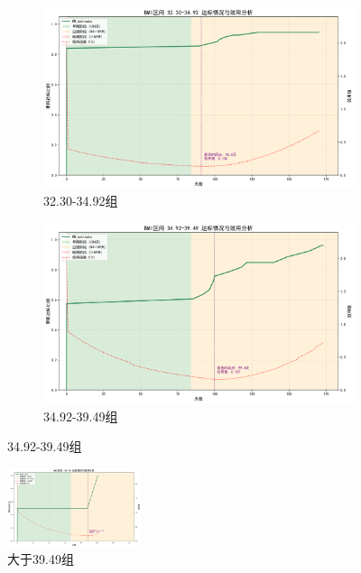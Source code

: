 \documentclass{article}
\begin{document}
\begin{figure}[H]
    \centering
    \begin{subfigure}[b]{0.35\textwidth}  %
        \centering
        \includegraphics[width=\textwidth]{graph/BMI_32.30_34.92_utility_analysis.png}  %
        \caption{32.30-34.92组}  %
        \label{fig:sub1}  %
    \end{subfigure}
    \hspace{0.05\textwidth}  %
    \begin{subfigure}[b]{0.35\textwidth}
        \centering
        \includegraphics[width=\textwidth]{graph/BMI_34.92_39.49_utility_analysis.png}
        \caption{34.92-39.49组}
        \label{fig:sub2}
    \end{subfigure}
    \label{fig:two}  %
\end{figure}
\begin{figure}[H]  %
    \centering  %
    \includegraphics[width=0.35\textwidth]{graph/BMI_gt39.49_utility_analysis.png}  %
    \caption{大于39.49组}  %
    \label{fig:single}  %
\end{figure}
\end{document}
